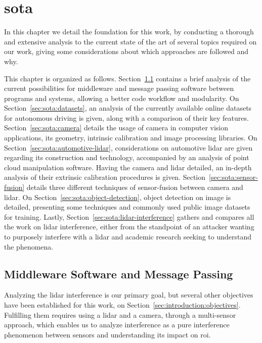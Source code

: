 \chapter{\acl{sota}}
\label{chapter:sota}
In this chapter we detail the foundation for this work, by conducting a thorough and extensive analysis to the current state of the art of several topics required on our work, giving some considerations about which approaches are followed and why.

This chapter is organized as follows. Section~\ref{sec:sota:software-middleware} contains a brief analysis of the current possibilities for middleware and message passing software between programs and systems, allowing a better code workflow and modularity. On Section~\ref{sec:sota:datasets}, an analysis of the currently available online datasets for autonomous driving is given, along with a comparison of their key features. Section~\ref{sec:sota:camera} details the usage of camera in computer vision applications, its geometry, intrinsic calibration and image processing libraries. On Section~\ref{sec:sota:automotive-lidar}, considerations on automotive \ac{lidar} are given regarding its construction and technology, accompanied by an analysis of point cloud manipulation software. Having the camera and \ac{lidar} detailed, an in-depth analysis of their extrinsic calibration procedures is given. Section~\ref{sec:sota:sensor-fusion} details three different techniques of sensor-fusion between camera and \ac{lidar}. On Section~\ref{sec:sota:object-detection}, object detection on image is detailed, presenting some techniques and commonly used  public image datasets for training. Lastly, Section~\ref{sec:sota:lidar-interference} gathers and compares all the work on \ac{lidar} interference, either from the standpoint of an attacker wanting to purposely interfere with a \ac{lidar} and academic research seeking to understand the phenomena.


\section{Middleware Software and Message Passing}
\label{sec:sota:software-middleware}
Analyzing the \ac{lidar} interference is our primary goal, but several other objectives have been established for this work, on Section~\ref{sec:introduction:objectives}. Fulfilling them requires using a \ac{lidar} and a camera, through a multi-sensor approach, which enables us to analyze interference as a pure interference phenomenon between sensors and understanding its impact on \ac{roi}.

